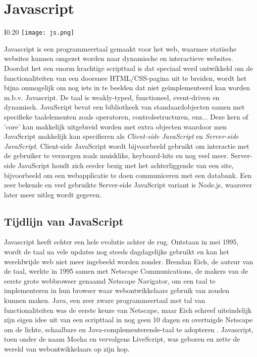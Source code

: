 \section{Javascript}
\label{sec:javascript}


\begin{wrapfigure}{I}{0.20\textwidth}
	\texttt{[image: js.png]}
\end{wrapfigure} Javascript is een programmeertaal gemaakt voor het web, waarmee statische websites kunnen omgezet worden naar dynamische en interactieve websites. Doordat het een enorm krachtige scripttaal is dat speciaal werd ontwikkeld om de functionaliteiten van een doorsnee HTML/CSS-pagina uit te breiden, wordt het bijna onmogelijk om nog iets in te beelden dat niet geïmplementeerd kan worden m.b.v. Javascript. De taal is weakly-typed, functioneel, event-driven en dynamisch. JavaScript bevat een bibliotheek van standaardobjecten samen met specifieke taalelementen zoals operatoren, controlestructuren, enz... Deze kern of 'core' kan makkelijk uitgebreid worden met extra objecten waardoor men JavaScript makkelijk kan specifieren als \textit{Client-side JavaScript} en \textit{Server-side JavaScript}. Client-side JavaScript wordt bijvoorbeeld gebruikt om interactie met de gebruiker te verzorgen zoals muiskliks, keyboard-hits en nog veel meer. Server-side JavaScript houdt zich eerder bezig met het achterliggende van een site, bijvoorbeeld om een webapplicatie te doen communiceren met een databank. Een zeer bekende en veel gebruikte Server-side JavaScript variant is Node.js, waarover later meer uitleg wordt gegeven. \autocite{Javascript2019}

\subsection{Tijdlijn van JavaScript}
\label{sec:jsTimeline}

Javascript heeft echter een hele evolutie achter de rug. Ontstaan in mei 1995, wordt de taal na vele updates nog steeds dagdagelijks gebruikt en kan het wereldwijde web niet meer ingebeeld worden zonder. Brendan Eich, de auteur van de taal, werkte in 1995 samen met Netscape Communications, de makers van de eerste grote webbrowser genaamd Netscape Navigator, om een taal te implementeren in hun browser waar webontwikkelaars gebruik van zouden kunnen maken. Java, een zeer zware programmeertaal met tal van functionaliteiten was de eerste keuze van Netscape, maar Eich schreef uiteindelijk zijn eigen idee uit van een scripttaal in nog geen 10 dagen en overtuigde Netscape om de lichte, schaalbare en Java-complementerende-taal te adopteren \autocite{Rangpariya2019}. Javascript, toen onder de naam Mocha en vervolgens LiveScript, was geboren en zette de wereld van webontwikkelaars op zijn kop.

